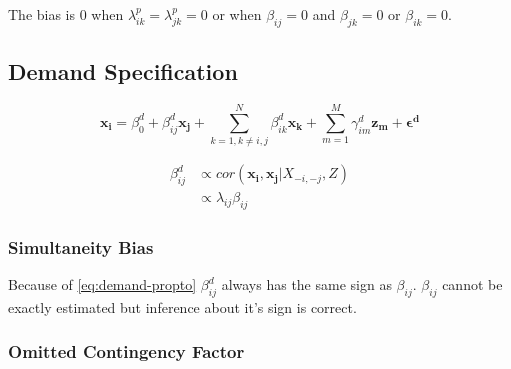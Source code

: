 \documentclass[12pt]{article}
\begin{document}
The bias is 0 when $\lambda^p_{ik} = \lambda^p_{jk} = 0$ or when 
$\beta_{ij} = 0$ and $\beta_{jk} = 0$ or $\beta_{ik} = 0$.


\subsection{Demand Specification}

\begin{equation*} 
    \mathbf{x_i} = \beta_0^d + \beta_{ij}^d \mathbf{x_j} 
	+ \sum_{k = 1, k \neq i,j}^N \beta_{ik}^d \mathbf{x_k} 
    + \sum_{m = 1}^M \gamma_{im}^d \mathbf{z_m}
    + \mathbf{\epsilon^d}
\end{equation*}

\begin{align}
\beta_{ij}^d & \propto cor(\mathbf{x_i}, \mathbf{x_j} | X_{-i, -j}, Z) \nonumber \\
          & \propto \lambda_{ij} \beta_{ij} \label{eq:demand-propto}
\end{align}


\subsubsection{Simultaneity Bias}

Because of \eqref{eq:demand-propto} $\beta_{ij}^d$ always has the same sign as $\beta_{ij}$. $\beta_{ij}$ cannot be exactly estimated but inference about it's sign is correct. 

\subsubsection{Omitted Contingency Factor}
\end{document}
